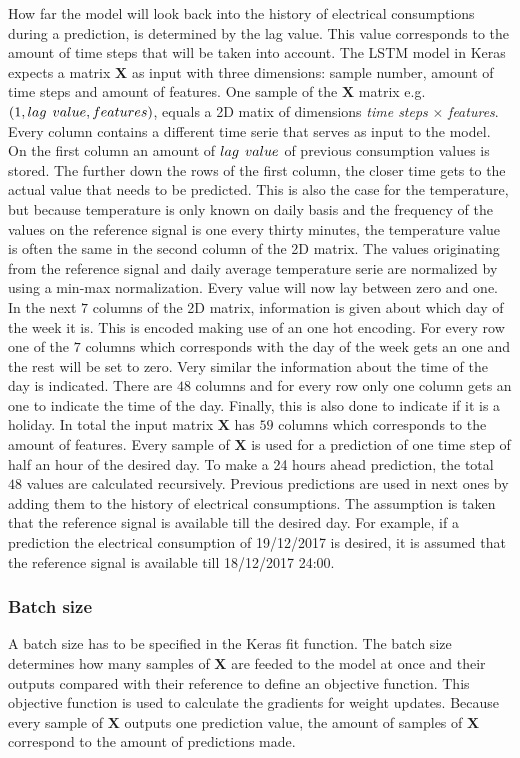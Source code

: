 How far the model will look back into the history of electrical consumptions during a prediction, is determined by the lag value. This value corresponds to the amount of time steps that will be taken into account. The LSTM model in Keras expects a matrix $ \bm{X} $ as input with three dimensions: sample number, amount of time steps and amount of features. 
One sample of the $ \bm{X} $ matrix e.g. $ (1,lag\hspace{1.5mm}value, features) $, equals a 2D matix of dimensions  \textit{time steps} $ \times $ \textit{features}. Every column contains a different time serie that serves as input to the model. On the first column an amount of $ lag\hspace{1.5mm}value $ of previous consumption values is stored. The further down the rows of the first column, the closer time gets to the actual value that needs to be predicted. This is also the case for the temperature, but because temperature is only known on daily basis and the frequency of the values on the reference signal is one every thirty minutes, the temperature value is often the same in the second column of the 2D matrix. The values originating from the reference signal and daily average temperature serie are normalized by using a min-max normalization. Every value will now lay between zero and one.\\
In the next $ 7 $ columns of the 2D matrix, information is given about which day of the week it is. This is encoded making use of an one hot encoding. For every row one of the $ 7 $ columns which corresponds with the day of the week gets an one and the rest will be set to zero. Very similar the information about the time of the day is indicated. There are $ 48 $ columns and for every row only one column gets an one to indicate the time of the day. Finally, this is also done to indicate if it is a holiday. In total the input matrix $ \bm{X} $ has $ 59  $ columns which corresponds to the amount of features. Every sample of $ \bm{X} $ is used for a prediction of one time step of half an hour of the desired day. To make a 24 hours ahead prediction, the total $ 48 $ values are calculated recursively. Previous predictions are used in next ones by adding them to the history of electrical consumptions. The assumption is taken that the reference signal is available till the desired day. For example, if a prediction the electrical consumption of 19/12/2017 is desired, it is assumed that the reference signal is available till 18/12/2017 24:00.

\subsubsection{Batch size}
A batch size has to be specified in the Keras fit function. The batch size determines how many samples of $ \bm{X} $ are feeded to the model at once and their outputs compared with their reference to define an objective function. This objective function is used to calculate the gradients for weight updates. Because every sample of $ \bm{X} $ outputs one prediction value, the amount of samples of $ \bm{X} $ correspond to the amount of predictions made.\\

